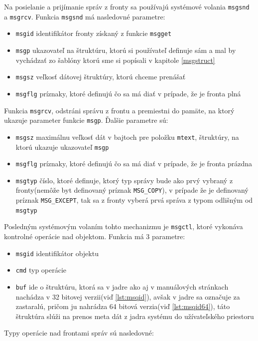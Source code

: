 Na posielanie a prijímanie správ z fronty sa používajú systémové volania \texttt{msgsnd} a \texttt{msgrcv}. Funkcia \texttt{msgsnd} má nasledovné parametre\cite{msgop}:
\begin{itemize}
\item \texttt{msgid} identifikátor fronty získaný z funkcie \texttt{msgget}
\item \texttt{msgp} ukazovateľ na štruktúru, ktorú si používateľ definuje sám a mal by vychádzať zo šablóny ktorú sme si popísali v kapitole \ref{msgstruct}
\item \texttt{msgsz} veľkosť dátovej štruktúry, ktorú chceme prenášať
\item \texttt{msgflg} príznaky, ktoré definujú čo sa má diať v prípade, že je fronta plná
\end{itemize}
Funkcia \texttt{msgrcv}, odstráni správu z frontu a premiestni do pamäte, na ktorý ukazuje parameter funkcie \texttt{msgp}. Ďalšie parametre sú\cite{msgop}:
\begin{itemize}
\item \texttt{msgsz} maximálnu veľkosť dát v bajtoch pre položku \texttt{mtext}, štruktúry, na ktorú ukazuje ukazovateľ \texttt{msgp}
\item \texttt{msgflg} príznaky, ktoré definujú čo sa má diať v prípade, že je fronta prázdna
\item \texttt{msgtyp} číslo, ktoré definuje, ktorý typ správy bude ako prvý vybraný z fronty(nemôže byt definovaný príznak \texttt{MSG\_COPY}), v prípade že je definovaný príznak \texttt{MSG\_EXCEPT}, tak sa z fronty vyberá prvá správa z typom odlišným od \texttt{msgtyp}
\end{itemize}
Posledným systémovým volaním tohto mechanizmu je \texttt{msgctl}, ktoré vykonáva kontrolné operácie nad objektom. Funkcia má 3 parametre\cite{msgctl}:
\begin{itemize}
\item \texttt{msgid} identifikátor objektu
\item \texttt{cmd} typ operácie
\item \texttt{buf} ide o štruktúru, ktorá sa v jadre ako aj v manuálových stránkach nachádza v 32 bitovej verzii(viď \ref{lst:msqid}), avšak v jadre sa označuje za zastaralú, pričom ju nahrádza 64 bitová verzia(viď \ref{lst:msqid64}), táto štruktúra slúži na prenos meta dát z jadra systému do užívateľského priestoru
\end{itemize}
Typy operácie nad frontami správ sú nasledovné\cite{msgctl}:
